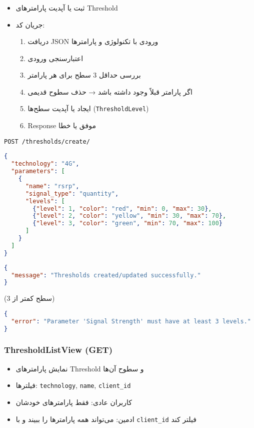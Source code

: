 \documentclass{report}
\begin{document}
\subsubsection{}
\begin{itemize}
    \item ثبت یا آپدیت پارامترهای Threshold
    \item جریان کد:
    \begin{enumerate}
        \item دریافت JSON ورودی با تکنولوژی و پارامترها
        \item اعتبارسنجی ورودی
        \item بررسی حداقل 3 سطح برای هر پارامتر
        \item اگر پارامتر قبلاً وجود داشته باشد → حذف سطوح قدیمی
        \item ایجاد یا آپدیت سطح‌ها (\texttt{ThresholdLevel})
        \item Response موفق  یا خطا 
    \end{enumerate}
\end{itemize}

\begin{center}
	\begin{latin}
		\texttt{POST \hspace{1cm}  /thresholds/create/}
	\end{latin}
\end{center}

\begin{lstlisting}[language=json]
{
  "technology": "4G",
  "parameters": [
    {
      "name": "rsrp",
      "signal_type": "quantity",
      "levels": [
        {"level": 1, "color": "red", "min": 0, "max": 30},
        {"level": 2, "color": "yellow", "min": 30, "max": 70},
        {"level": 3, "color": "green", "min": 70, "max": 100}
      ]
    }
  ]
}
\end{lstlisting}

\begin{lstlisting}[language=json]
{
  "message": "Thresholds created/updated successfully."
}
\end{lstlisting}

(سطح کمتر از 3)
\begin{lstlisting}[language=json]
{
  "error": "Parameter 'Signal Strength' must have at least 3 levels."
}
\end{lstlisting}

\subsubsection{ThresholdListView (GET)}
\begin{itemize}
    \item نمایش پارامترهای Threshold و سطوح آن‌ها
    \item فیلترها: \texttt{technology}, \texttt{name}, \texttt{client\_id}
    \item کاربران عادی: فقط پارامترهای خودشان
    \item ادمین: می‌تواند همه پارامترها را ببیند و با \texttt{client\_id} فیلتر کند
\end{itemize}
\end{document}
